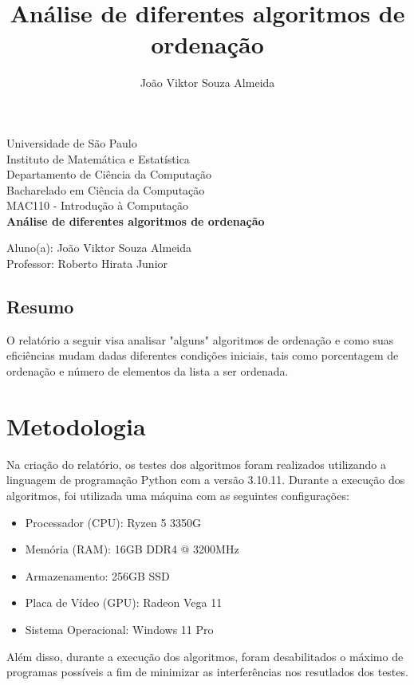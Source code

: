 \documentclass[10pt,a4paper]{article}
\author{João Viktor Souza Almeida}
\title{Análise de diferentes algoritmos de ordenação}
\begin{document}
\begin{titlepage} %
    \begin{center} %
    {\large Universidade de São Paulo}\\[0.2cm] %
    {\large Instituto de Matemática e Estatística}\\[0.2cm] %
    {\large Departamento de Ciência da Computação}\\[0.2cm]
    {\large Bacharelado em Ciência da Computação}\\[0.2cm]
    {\large MAC110 - Introdução à Computação}\\[5.1cm]
    {\bf \huge Análise de diferentes algoritmos de ordenação}\\[5.1cm] 
    \end{center} %
    {\large Aluno(a): João Viktor Souza Almeida}\\[0.7cm] %
    {\large Professor: Roberto Hirata Junior}\\[5.1cm]
    \end{titlepage} %

\subsection*{Resumo}
O relatório a seguir visa analisar "alguns" algoritmos de ordenação e como suas eficiências mudam dadas diferentes condições iniciais, tais como porcentagem de ordenação e número de elementos da lista a ser ordenada. 
\
\section*{Metodologia}
Na criação do relatório, os testes dos algoritmos foram realizados utilizando a linguagem de programação Python com a versão 3.10.11. Durante a execução dos algoritmos, foi utilizada uma máquina com as seguintes configurações:
\begin{itemize}
\item    Processador (CPU): Ryzen 5 3350G 
\item Memória (RAM): 16GB DDR4 @ 3200MHz
\item Armazenamento: 256GB SSD
\item Placa de Vídeo (GPU): Radeon Vega 11
\item Sistema Operacional: Windows 11 Pro
\end{itemize}
Além disso, durante a execução dos algoritmos, foram desabilitados o máximo de programas possíveis a fim de minimizar as interferências nos resutlados dos testes. 
\end{document}

